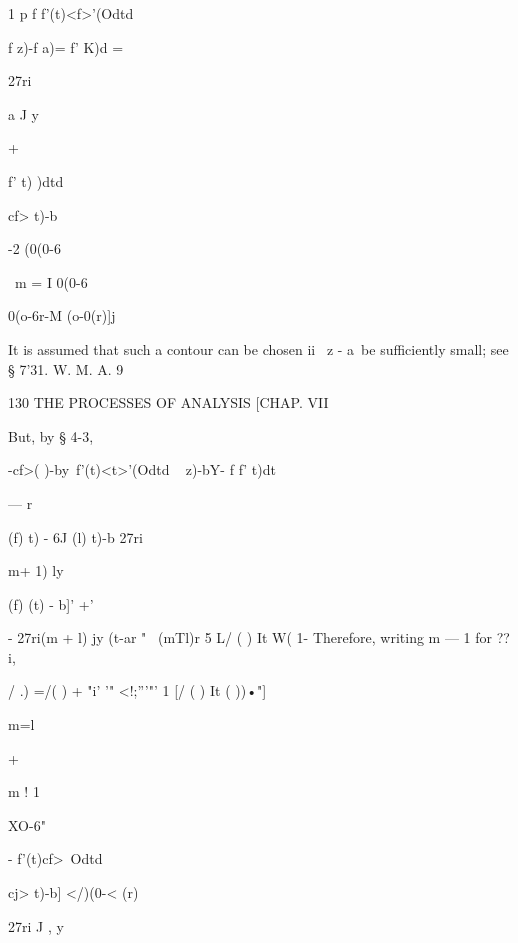1 p f f'(t)<f>'(Odtd



f z)-f a)= f' K)d =



27ri



a J y



+



f' t) )dtd

cf> t)-b



-2 (0(0-6



\ m = I 0(0-6



 0(o-6r-M (o-0(r)]j



It is assumed that such a contour can be chosen ii \ z - a\ be
sufficiently small; see § 7'31. W. M. A. 9



130 THE PROCESSES OF ANALYSIS [CHAP. VII

But, by § 4-3,

-cf>( )-by\ f'(t)<t>'(Odtd \ < > z)-bY- f f' t)dt



— r



(f) t) - 6J (l) t)-b 27ri



 m+ 1) ly



 (f) (t) - b]' +'



- 27ri(m + l) jy (t-ar " ~(mTl)r 5 L/ ( ) It W( 1- Therefore, writing
m — 1 for ??i,

/ .) =/( ) + "i' '" <!;'''"' 1 [/ ( ) It ( ))•"]



m=l



+



m ! 1



XO-6"



- f'(t)cf>\ Odtd



cj> t)-b] </)(0-< (r)



27ri J , y

